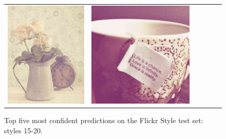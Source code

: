 \begin{figure}
\begin{tabular}{m{.01\linewidth} m{.16\linewidth} m{.16\linewidth} m{.16\linewidth} m{.16\linewidth} m{.16\linewidth}}
    \includegraphics[width=\linewidth]{../style/figures/flickr_on_flickr/pred_style_Vintage/3.jpg} &
    \includegraphics[width=\linewidth]{../style/figures/flickr_on_flickr/pred_style_Vintage/4.jpg}
\end{tabular}
\caption{
    Top five most confident predictions on the Flickr Style test set: styles 15-20.
}\label{fig:flickr_on_flickr3}
\end{figure}
